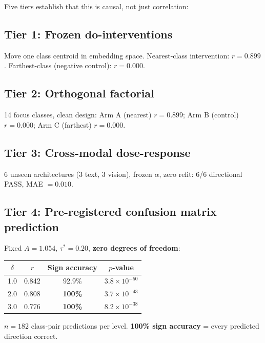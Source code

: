 \documentclass[11pt,a4paper]{article}
\begin{document}
Five tiers establish that this is causal, not just correlation:

\subsection{Tier 1: Frozen do-interventions}

Move one class centroid in embedding space. Nearest-class intervention: $r = 0.899$. Farthest-class (negative control): $r = 0.000$.

\subsection{Tier 2: Orthogonal factorial}

14 focus classes, clean design: Arm A (nearest) $r = 0.899$; Arm B (control) $r = 0.000$; Arm C (farthest) $r = 0.000$.

\subsection{Tier 3: Cross-modal dose-response}

6 unseen architectures (3 text, 3 vision), frozen $\alpha$, zero refit: 6/6 directional PASS, MAE $= 0.010$.

\subsection{Tier 4: Pre-registered confusion matrix prediction}

\begin{resultbox}
Fixed $A = 1.054$, $\tau^* = 0.20$, \textbf{zero degrees of freedom}:

\begin{center}
\begin{tabular}{cccc}
\toprule
$\delta$ & $r$ & Sign accuracy & $p$-value \\
\midrule
1.0 & 0.842 & 92.9\% & $3.8 \times 10^{-50}$ \\
2.0 & 0.808 & \textbf{100\%} & $3.7 \times 10^{-43}$ \\
3.0 & 0.776 & \textbf{100\%} & $8.2 \times 10^{-38}$ \\
\bottomrule
\end{tabular}
\end{center}
$n = 182$ class-pair predictions per level. \textbf{100\% sign accuracy} = every predicted direction correct.
\end{resultbox}
\end{document}
